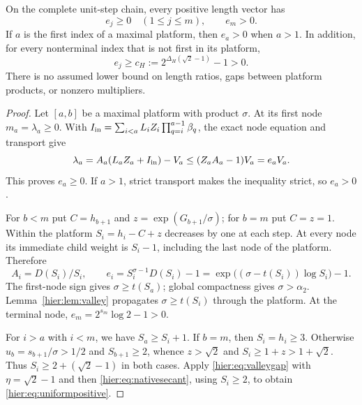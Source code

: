 \begin{theorem}\label{hier:thm:positive}
On the complete unit-step chain, every positive length vector has
\begin{equation}
 e_j\ge0\quad(1\le j\le m),\qquad e_m>0.
 \label{hier:eq:allpositive}
\end{equation}
If $a$ is the first index of a maximal platform, then $e_a>0$ when
$a>1$. In addition, for every nonterminal index that is not first
in its platform,
\begin{equation}
 e_j\ge c_H:=2^{\Delta_H(\sqrt2-1)}-1>0.
 \label{hier:eq:uniformpositive}
\end{equation}
There is no assumed lower bound on length ratios, gaps between
platform products, or nonzero multipliers.
\end{theorem}
\begin{proof}
Let $[a,b]$ be a maximal platform with product $\sigma$. At its
first node $m_a=\lambda_a\ge0$. With
$I_{\rm in}=\sum_{i<a}L_iZ_i\prod_{q=i}^{a-1}\beta_q$, the exact
node equation and transport give
\begin{equation}
 \lambda_a=A_a(L_aZ_a+I_{\rm in})-V_a
 \le (Z_aA_a-1)V_a=e_aV_a. \label{hier:eq:firstsign}
\end{equation}
This proves $e_a\ge0$. If $a>1$, strict transport makes the
inequality strict, so $e_a>0$.

For $b<m$ put $C=h_{b+1}$ and $z=\exp(G_{b+1}/\sigma)$;
for $b=m$ put $C=z=1$. Within the platform
$S_i=h_i-C+z$ decreases by one at each step. At every node its
immediate child weight is $S_i-1$, including the last node of the
platform. Therefore
\begin{equation}
 A_i=D(S_i)/S_i,\qquad
 e_i=S_i^{\sigma-1}D(S_i)-1
     =\exp\bigl((\sigma-t(S_i))\log S_i\bigr)-1.
 \label{hier:eq:nativesecant}
\end{equation}
The first-node sign gives $\sigma\ge t(S_a)$; global compactness
gives $\sigma>\alpha_2$. Lemma~\ref{hier:lem:valley} propagates
$\sigma\ge t(S_i)$ through the platform. At the terminal node,
$e_m=2^{s_m}\log2-1>0$.

For $i>a$ with $i<m$, we have $S_a\ge S_i+1$. If $b=m$, then
$S_i=h_i\ge3$. Otherwise $u_b=s_{b+1}/\sigma>1/2$ and
$S_{b+1}\ge2$, whence $z>\sqrt2$ and $S_i\ge1+z>1+\sqrt2$.
Thus $S_i\ge2+(\sqrt2-1)$ in both cases. Apply
\eqref{hier:eq:valleygap} with $\eta=\sqrt2-1$ and then
\eqref{hier:eq:nativesecant}, using $S_i\ge2$, to obtain
\eqref{hier:eq:uniformpositive}.
\end{proof}

